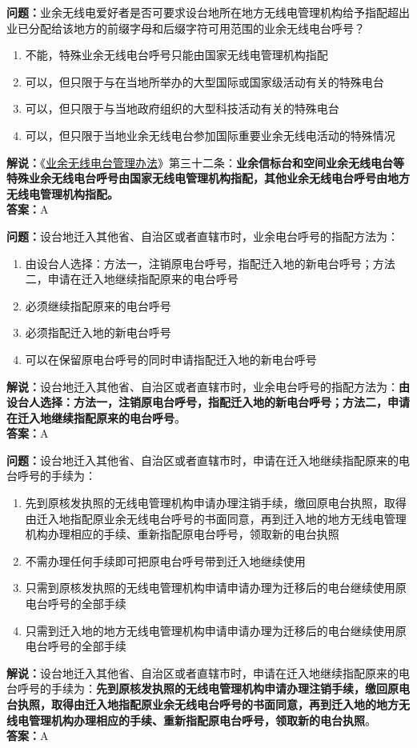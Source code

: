\textbf{问题：}业余无线电爱好者是否可要求设台地所在地方无线电管理机构给予指配超出业已分配给该地方的前缀字母和后缀字符可用范围的业余无线电台呼号？
\begin{enumerate}[label=\Alph*), leftmargin=1cm]
	\item 不能，特殊业余无线电台呼号只能由国家无线电管理机构指配
	\item 可以，但只限于与在当地所举办的大型国际或国家级活动有关的特殊电台
	\item 可以，但只限于与当地政府组织的大型科技活动有关的特殊电台
	\item 可以，但只限于当地业余无线电台参加国际重要业余无线电活动的特殊情况
\end{enumerate}
\textbf{解说：}《\href{https://www.miit.gov.cn/jgsj/zfs/bmgz/art/2020/art_147b69815b3641caad9047735f94c860.html}{业余无线电台管理办法}》第三十二条：\textbf{业余信标台和空间业余无线电台等特殊业余无线电台呼号由国家无线电管理机构指配，其他业余无线电台呼号由地方无线电管理机构指配。}\\\textbf{答案：}A

\textbf{问题：}设台地迁入其他省、自治区或者直辖市时，业余电台呼号的指配方法为：
\begin{enumerate}[label=\Alph*), leftmargin=1cm]
	\item 由设台人选择：方法一，注销原电台呼号，指配迁入地的新电台呼号；方法二，申请在迁入地继续指配原来的电台呼号
	\item 必须继续指配原来的电台呼号
	\item 必须指配迁入地的新电台呼号
	\item 可以在保留原电台呼号的同时申请指配迁入地的新电台呼号
\end{enumerate}
\textbf{解说：}设台地迁入其他省、自治区或者直辖市时，业余电台呼号的指配方法为：\textbf{由设台人选择：方法一，注销原电台呼号，指配迁入地的新电台呼号；方法二，申请在迁入地继续指配原来的电台呼号}。\\\textbf{答案：}A%

\textbf{问题：}设台地迁入其他省、自治区或者直辖市时，申请在迁入地继续指配原来的电台呼号的手续为：
\begin{enumerate}[label=\Alph*), leftmargin=1cm]
	\item 先到原核发执照的无线电管理机构申请办理注销手续，缴回原电台执照，取得由迁入地指配原业余无线电台呼号的书面同意，再到迁入地的地方无线电管理机构办理相应的手续、重新指配原电台呼号，领取新的电台执照
	\item 不需办理任何手续即可把原电台呼号带到迁入地继续使用
	\item 只需到原核发执照的无线电管理机构申请申请办理为迁移后的电台继续使用原电台呼号的全部手续
	\item 只需到迁入地的地方无线电管理机构申请申请办理为迁移后的电台继续使用原电台呼号的全部手续
\end{enumerate}
\textbf{解说：}设台地迁入其他省、自治区或者直辖市时，申请在迁入地继续指配原来的电台呼号的手续为：\textbf{先到原核发执照的无线电管理机构申请办理注销手续，缴回原电台执照，取得由迁入地指配原业余无线电台呼号的书面同意，再到迁入地的地方无线电管理机构办理相应的手续、重新指配原电台呼号，领取新的电台执照}。\\\textbf{答案：}A%


